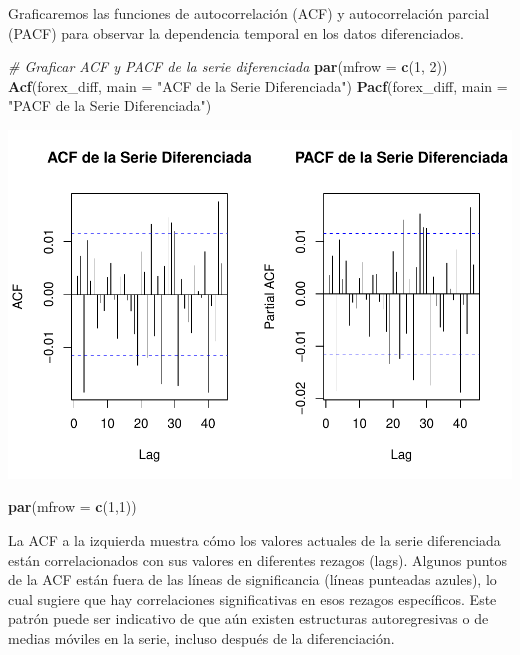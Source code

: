 \documentclass[
]{book}
\newenvironment{Shaded}{\begin{snugshade}}{\end{snugshade}}
\newcommand{\AttributeTok}[1]{\textcolor[rgb]{0.13,0.29,0.53}{#1}}
\newcommand{\CommentTok}[1]{\textcolor[rgb]{0.56,0.35,0.01}{\textit{#1}}}
\newcommand{\DecValTok}[1]{\textcolor[rgb]{0.00,0.00,0.81}{#1}}
\newcommand{\FunctionTok}[1]{\textcolor[rgb]{0.13,0.29,0.53}{\textbf{#1}}}
\newcommand{\NormalTok}[1]{#1}
\newcommand{\StringTok}[1]{\textcolor[rgb]{0.31,0.60,0.02}{#1}}
\begin{document}
Graficaremos las funciones de autocorrelación (ACF) y autocorrelación parcial (PACF) para observar la dependencia temporal en los datos diferenciados.

\begin{Shaded}
\begin{Highlighting}[]
\CommentTok{\# Graficar ACF y PACF de la serie diferenciada}
\FunctionTok{par}\NormalTok{(}\AttributeTok{mfrow =} \FunctionTok{c}\NormalTok{(}\DecValTok{1}\NormalTok{, }\DecValTok{2}\NormalTok{))}
\FunctionTok{Acf}\NormalTok{(forex\_diff, }\AttributeTok{main =} \StringTok{"ACF de la Serie Diferenciada"}\NormalTok{)}
\FunctionTok{Pacf}\NormalTok{(forex\_diff, }\AttributeTok{main =} \StringTok{"PACF de la Serie Diferenciada"}\NormalTok{)}
\end{Highlighting}
\end{Shaded}

\includegraphics{bookdown_time_series_files/figure-latex/acf-pacf-1.pdf}

\begin{Shaded}
\begin{Highlighting}[]
\FunctionTok{par}\NormalTok{(}\AttributeTok{mfrow =} \FunctionTok{c}\NormalTok{(}\DecValTok{1}\NormalTok{,}\DecValTok{1}\NormalTok{))}
\end{Highlighting}
\end{Shaded}

La ACF a la izquierda muestra cómo los valores actuales de la serie diferenciada están correlacionados con sus valores en diferentes rezagos (lags). Algunos puntos de la ACF están fuera de las líneas de significancia (líneas punteadas azules), lo cual sugiere que hay correlaciones significativas en esos rezagos específicos. Este patrón puede ser indicativo de que aún existen estructuras autoregresivas o de medias móviles en la serie, incluso después de la diferenciación.
\end{document}
